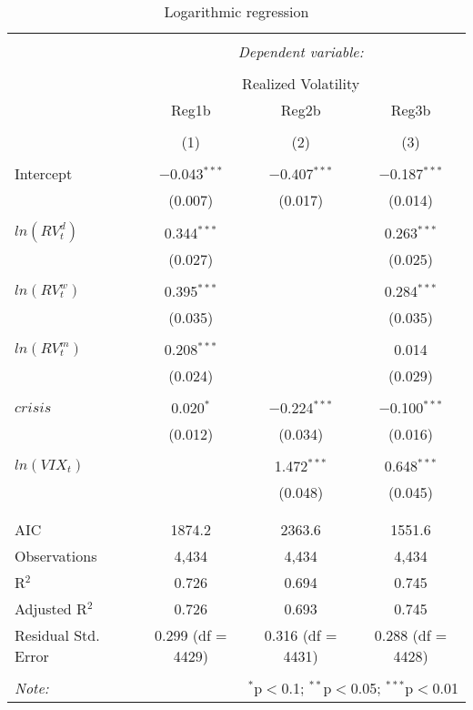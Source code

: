
\begin{table}[!htbp] \centering 
  \caption{Logarithmic regression} 
  \label{} 
\begin{tabular}{@{\extracolsep{5pt}}lccc} 
\\[-1.8ex]\hline 
\hline \\[-1.8ex] 
 & \multicolumn{3}{c}{\textit{Dependent variable:}} \\ 
\cline{2-4} 
\\[-1.8ex] & \multicolumn{3}{c}{Realized Volatility} \\ 
 & Reg1b & Reg2b & Reg3b \\ 
\\[-1.8ex] & (1) & (2) & (3)\\ 
\hline \\[-1.8ex] 
 Intercept & $-$0.043$^{***}$ & $-$0.407$^{***}$ & $-$0.187$^{***}$ \\ 
  & (0.007) & (0.017) & (0.014) \\ 
  & & & \\ 
 $ln(RV^{d}_{t})$ & 0.344$^{***}$ &  & 0.263$^{***}$ \\ 
  & (0.027) &  & (0.025) \\ 
  & & & \\ 
 $ln(RV^{w}_{t})$ & 0.395$^{***}$ &  & 0.284$^{***}$ \\ 
  & (0.035) &  & (0.035) \\ 
  & & & \\ 
 $ ln(RV^{m}_{t})$ & 0.208$^{***}$ &  & 0.014 \\ 
  & (0.024) &  & (0.029) \\ 
  & & & \\ 
 $crisis$ & 0.020$^{*}$ & $-$0.224$^{***}$ & $-$0.100$^{***}$ \\ 
  & (0.012) & (0.034) & (0.016) \\ 
  & & & \\ 
 $ln(VIX_{t})$ &  & 1.472$^{***}$ & 0.648$^{***}$ \\ 
  &  & (0.048) & (0.045) \\ 
  & & & \\ 
\hline \\[-1.8ex] 
AIC & 1874.2 & 2363.6 & 1551.6 \\ 
Observations & 4,434 & 4,434 & 4,434 \\ 
R$^{2}$ & 0.726 & 0.694 & 0.745 \\ 
Adjusted R$^{2}$ & 0.726 & 0.693 & 0.745 \\ 
Residual Std. Error & 0.299 (df = 4429) & 0.316 (df = 4431) & 0.288 (df = 4428) \\ 
\hline 
\hline \\[-1.8ex] 
\textit{Note:}  & \multicolumn{3}{r}{$^{*}$p$<$0.1; $^{**}$p$<$0.05; $^{***}$p$<$0.01} \\ 
\end{tabular} 
\end{table} 
